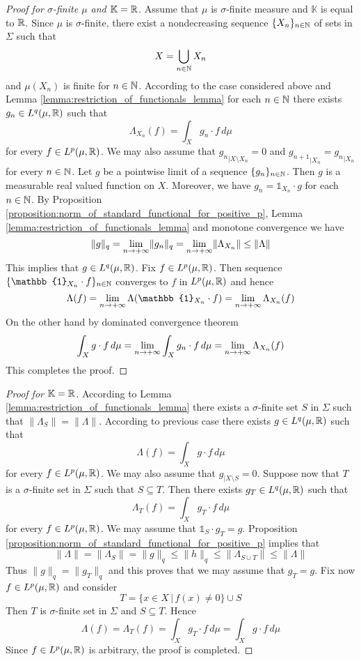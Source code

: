 \begin{proof}[Proof for $\sigma$-finite $\mu$ and $\mathbb{K}={\mathbb R}$]
  Assume that $\mu$ is $\sigma$-finite measure and $\mathbb{K}$ is equal to ${\mathbb R}$. Since $\mu$ is $\sigma$-finite, there exist a nondecreasing sequence $\{X_n\}_{n\in {\mathbb N}}$ of sets in $\Sigma$ such that
  $$X = \bigcup_{n\in {\mathbb N}}X_n$$
  and $\mu(X_n)$ is finite for $n\in {\mathbb N}$. According to the case considered above and Lemma \ref{lemma:restriction_of_functionals_lemma} for each $n \in {\mathbb N}$ there exists $g_n\in L^q(\mu,{\mathbb R})$ such that
  $$\Lambda_{X_n}\left(f\right) = \int_Xg_n\cdot f\,d\mu$$
  for every $f \in L^p(\mu,{\mathbb R})$. We may also assume that ${g_n}_{\mid X\setminus X_n} = 0$ and ${g_{n+1}}_{\mid X_n} = {g_n}_{\mid X_n}$ for every $n \in {\mathbb N}$. Let $g$ be a pointwise limit of a sequence $\{g_n\}_{n\in {\mathbb N}}$. Then $g$ is a measurable real valued function on $X$. Moreover, we have $g_n = \mathbb{1}_{X_n}\cdot g$ for each $n \in {\mathbb N}$. By Proposition \ref{proposition:norm_of_standard_functional_for_positive_p}, Lemma \ref{lemma:restriction_of_functionals_lemma} and monotone convergence we have
  $$\lVert g \rVert_q = \lim_{n\rightarrow +\infty}\lVert g_n\rVert_q = \lim_{n\rightarrow +\infty}\lVert \Lambda_{X_n} \rVert \leq \lVert \Lambda \rVert$$
  This implies that $g \in L^q(\mu,{\mathbb R})$. Fix $f \in L^p(\mu, {\mathbb R})$. Then sequence $\{\mathbb{1}_{X_n}\cdot f\}_{n \in \NN}$ converges to $f$ in $L^p(\mu,{\mathbb R})$ and hence
  $$\Lambda(f) = \lim_{n\ra +\infty}\Lambda(\mathbb{1}_{X_n}\cdot f) = \lim_{n\ra +\infty}\Lambda_{X_n}(f)$$
  On the other hand by dominated convergence theorem
  $$\int_Xg\cdot f\,d\mu = \lim_{n\rightarrow +\infty}\int_Xg_n\cdot f\,d\mu = \lim_{n\rightarrow +\infty}\Lambda_{X_n}(f)$$
  This completes the proof.
\end{proof}


\begin{proof}[Proof for $\mathbb{K} = {\mathbb R}$]
  According to Lemma \ref{lemma:restriction_of_functionals_lemma} there exists a $\sigma$-finite set $S$ in $\Sigma$ such that $\lVert \Lambda_S \rVert = \lVert \Lambda \rVert$. According to previous case there exists $g \in L^q(\mu,{\mathbb R})$ such that
  $$\Lambda(f) = \int_Xg\cdot f\,d\mu$$
  for every $f \in L^p(\mu,{\mathbb R})$. We may also assume that $g_{\mid X\setminus S} = 0$. Suppose now that $T$ is a $\sigma$-finite set in $\Sigma$ such that $S\subseteq T$. Then there exists $g_T \in L^q(\mu,{\mathbb R})$ such that
  $$\Lambda_{T}(f) = \int_Xg_T\cdot f\,d\mu$$
  for every $f \in L^p(\mu,{\mathbb R})$. We may assume that $\mathbb{1}_S \cdot g_T = g$. Proposition \ref{proposition:norm_of_standard_functional_for_positive_p} implies that
  $$\lVert \Lambda \rVert = \lVert \Lambda_S \rVert = \lVert g \rVert_q \leq \lVert h \rVert_q \leq \lVert \Lambda_{S\cup T}\rVert \leq \lVert \Lambda \rVert$$
  Thus $\lVert g \rVert_q = \lVert g_T \rVert_q$ and this proves that we may assume that $g_T = g$. Fix now $f \in L^p(\mu,{\mathbb R})$ and consider
  $$T = \big\{x\in X\,\big|\,f(x) \neq 0\big\} \cup S$$
  Then $T$ is $\sigma$-finite set in $\Sigma$ and $S\subseteq T$. Hence
  $$\Lambda(f) = \Lambda_T(f) = \int_Xg_T\cdot f\,d\mu = \int_Xg\cdot f\,d\mu$$
  Since $f \in L^p(\mu,{\mathbb R})$ is arbitrary, the proof is completed.
\end{proof}

